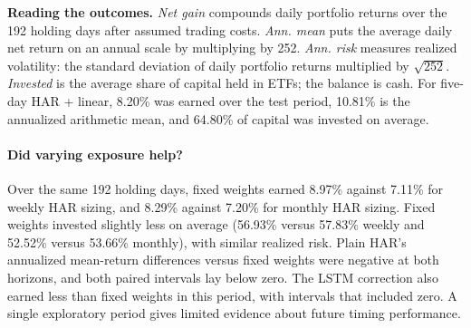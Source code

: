 \documentclass[11pt]{article}
\begin{document}
\begin{table}[htbp]
\begin{minipage}{.97\linewidth}
\textbf{Reading the outcomes.} \emph{Net gain} compounds daily portfolio returns over the 192 holding days after assumed trading costs. \emph{Ann. mean} puts the average daily net return on an annual scale by multiplying by 252. \emph{Ann. risk} measures realized volatility: the standard deviation of daily portfolio returns multiplied by $\sqrt{252}$. \emph{Invested} is the average share of capital held in ETFs; the balance is cash. For five-day HAR + linear, 8.20\% was earned over the test period, 10.81\% is the annualized arithmetic mean, and 64.80\% of capital was invested on average.
\end{minipage}\end{table}
\paragraph{Did varying exposure help?} Over the same 192 holding days, fixed weights earned 8.97\% against 7.11\% for weekly HAR sizing, and 8.29\% against 7.20\% for monthly HAR sizing. Fixed weights invested slightly less on average (56.93\% versus 57.83\% weekly and 52.52\% versus 53.66\% monthly), with similar realized risk. Plain HAR's annualized mean-return differences versus fixed weights were negative at both horizons, and both paired intervals lay below zero. The LSTM correction also earned less than fixed weights in this period, with intervals that included zero. A single exploratory period gives limited evidence about future timing performance.
\end{document}
